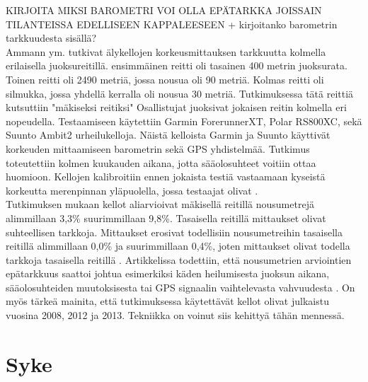 \documentclass[utf8,bachelor,finnish]{bachelor}
\begin{document}
    KIRJOITA MIKSI BAROMETRI VOI OLLA EPÄTARKKA JOISSAIN TILANTEISSA EDELLISEEN KAPPALEESEEN + kirjoitanko barometrin tarkkuudesta sisällä?\\

    Ammann ym. tutkivat älykellojen korkeusmittauksen tarkkuutta kolmella erilaisella juoksureitillä. ensimmäinen reitti oli tasainen 400 metrin juoksurata.
     Toinen reitti oli 2490 metriä, jossa nousua oli 90 metriä. Kolmas reitti oli silmukka, jossa yhdellä kerralla oli nousua 30 metriä. Tutkimuksessa tätä reittiä kutsuttiin "mäkiseksi reitiksi"
      Osallistujat juoksivat jokaisen reitin kolmella eri nopeudella. Testaamiseen käytettiin Garmin ForerunnerXT, Polar RS800XC, sekä Suunto Ambit2 urheilukelloja. Näistä kelloista Garmin ja
       Suunto käyttivät korkeuden mittaamiseen barometrin sekä GPS yhdistelmää. \parencite[.]{ammann_accuracy_2016} Tutkimus toteutettiin kolmen kuukauden aikana, jotta sääolosuhteet voitiin ottaa huomioon.
         Kellojen kalibroitiin ennen jokaista testiä vastaamaan kyseistä korkeutta merenpinnan yläpuolella, jossa testaajat olivat \parencite{ammann_accuracy_2016}.\\

    Tutkimuksen mukaan kellot aliarvioivat mäkisellä reitillä nousumetrejä alimmillaan 3,3\% suurimmillaan 9,8\%. Tasaisella reitillä mittaukset olivat suhteellisen tarkkoja.
     Mittaukset erosivat todellisiin nousumetreihin tasaisella reitillä alimmillaan 0,0\% ja suurimmillaan 0,4\%, joten mittaukset olivat todella tarkkoja tasaisella reitillä \parencite{ammann_accuracy_2016}.
      Artikkelissa todettiin, että nousumetrien arviointien epätarkkuus saattoi johtua esimerkiksi käden heilumisesta juoksun aikana, sääolosuhteiden muutoksisesta tai GPS signaalin vaihtelevasta vahvuudesta \parencite{ammann_accuracy_2016}.
       On myös tärkeä mainita, että tutkimuksessa käytettävät kellot olivat julkaistu vuosina 2008, 2012 ja 2013. Tekniikka on voinut siis kehittyä tähän mennessä.\\


  \section{Syke} 
\end{document}
